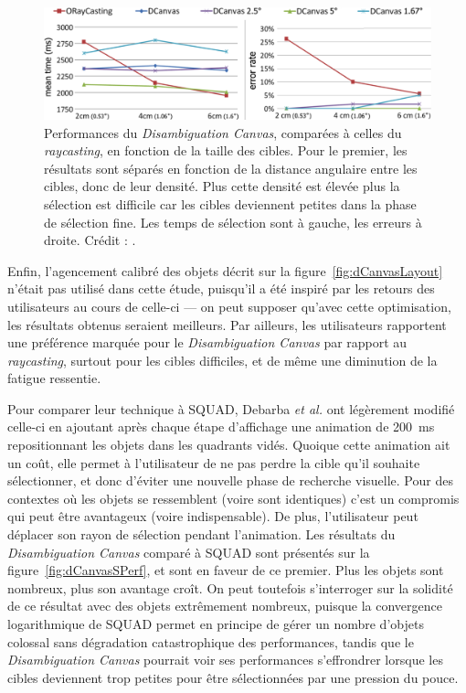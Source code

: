 	\begin{figure}[!htbp]
		\centering
		\includegraphics[width=\textwidth]{figures/ch2/dCanvasRCPerf}
		\caption[\emph{Disambiguation Canvas} -- performances I]{Performances du \emph{Disambiguation Canvas}, comparées à celles du \emph{raycasting}, en fonction de la taille des cibles. Pour le premier, les résultats sont séparés en fonction de la distance angulaire entre les cibles, donc de leur densité. Plus cette densité est élevée plus la sélection est difficile car les cibles deviennent petites dans la phase de sélection fine. Les temps de sélection sont à gauche, les erreurs à droite. Crédit : \cite{debarba2013disambiguation}.}
		\label{fig:dCanvasRCPerf}
	\end{figure}

	Enfin, l'agencement calibré des objets décrit sur la figure~\ref{fig:dCanvasLayout} n'était pas utilisé dans cette étude, puisqu'il a été inspiré par les retours des utilisateurs au cours de celle-ci --- on peut supposer qu'avec cette optimisation, les résultats obtenus seraient meilleurs. Par ailleurs, les utilisateurs rapportent une préférence marquée pour le \emph{Disambiguation Canvas} par rapport au \emph{raycasting}, surtout pour les cibles difficiles, et de même une diminution de la fatigue ressentie.
	
	Pour comparer leur technique à SQUAD, Debarba \emph{et al.} ont légèrement modifié celle-ci en ajoutant après chaque étape \og d'affichage \fg{} une animation de 200~ms repositionnant les objets dans les quadrants vidés. Quoique cette animation ait un coût, elle permet à l'utilisateur de ne pas perdre la cible qu'il souhaite sélectionner, et donc d'éviter une nouvelle phase de recherche visuelle. Pour des contextes où les objets se ressemblent (voire sont identiques) c'est un compromis qui peut être avantageux (voire indispensable). De plus, l'utilisateur peut déplacer son rayon de sélection pendant l'animation. Les résultats du \emph{Disambiguation Canvas} comparé à SQUAD sont présentés sur la figure~\ref{fig:dCanvasSPerf}, et sont en faveur de ce premier. Plus les objets sont nombreux, plus son avantage croît. On peut toutefois s'interroger sur la solidité de ce résultat avec des objets extrêmement nombreux, puisque la convergence logarithmique de SQUAD permet en principe de gérer un nombre d'objets colossal sans dégradation catastrophique des performances, tandis que le \emph{Disambiguation Canvas} pourrait voir ses performances s'effrondrer lorsque les cibles deviennent trop petites pour être sélectionnées par une pression du pouce.	
	
